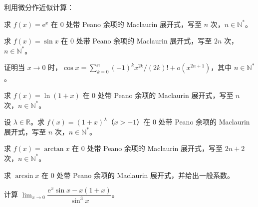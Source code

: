 \newpage
\noindent\begin{minipage}{\textwidth}
利用微分作近似计算：
\end{minipage}\par\vfill
\noindent\begin{minipage}{\textwidth}
求 $f(x)=\mathrm e^x$ 在 $0$ 处带 Peano 余项的 Maclaurin 展开式，写至 $n$ 次，$n\in\mathbb N^*$。
\end{minipage}\par\vfill
\noindent\begin{minipage}{\textwidth}
求 $f(x)=\sin x$ 在 $0$ 处带 Peano 余项的 Maclaurin 展开式，写至 $2n$ 次，$n\in\mathbb N^*$。
\end{minipage}\par\vfill
\newpage
\noindent\begin{minipage}{\textwidth}
证明当 $x\to0$ 时，$\cos x=\sum_{k=0}^n(-1)^k x^{2k}/(2k)!+o(x^{2n+1})$，其中 $n\in\mathbb N^*$。
\end{minipage}\par\vfill
\noindent\begin{minipage}{\textwidth}
求 $f(x)=\ln(1+x)$ 在 $0$ 处带 Peano 余项的 Maclaurin 展开式，写至 $n$ 次，$n\in\mathbb N^*$。
\end{minipage}\par\vfill
\noindent\begin{minipage}{\textwidth}
设 $\lambda\in\mathbb R$。求 $f(x)=(1+x)^\lambda$（$x>-1$）在 $0$ 处带 Peano 余项的 Maclaurin 展开式，写至 $n$ 次，$n\in\mathbb N^*$。
\end{minipage}\par\vfill
\newpage
\noindent\begin{minipage}{\textwidth}
求 $f(x)=\arctan x$ 在 $0$ 处带 Peano 余项的 Maclaurin 展开式，写至 $2n+2$ 次，$n\in\mathbb N^*$。
\end{minipage}\par\vfill
\noindent\begin{minipage}{\textwidth}
求 $\arcsin x$ 在 $0$ 处带 Peano 余项的 Maclaurin 展开式，并给出一般系数。
\end{minipage}\par\vfill
\noindent\begin{minipage}{\textwidth}
计算 $\lim_{x\to0}\dfrac{\mathrm e^x\sin x-x(1+x)}{\sin^3x}$。
\end{minipage}\par\vfill
